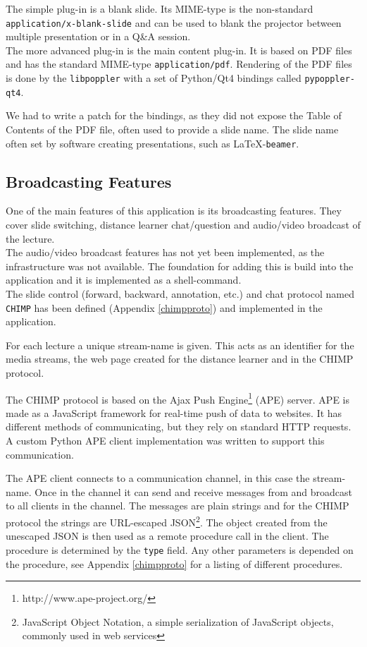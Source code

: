 \documentclass[a4paper,12pt]{article}
\begin{document}
The simple plug-in is a blank slide. Its MIME-type is the non-standard \texttt{application/x-blank-slide} and can be used to blank the projector between multiple presentation or in a Q\&A session.
\\

The more advanced plug-in is the main content plug-in. It is based on PDF files and has the standard MIME-type \texttt{application/pdf}. Rendering of the PDF files is done by the \texttt{libpoppler} with a set of Python/Qt4 bindings called \texttt{pypoppler-qt4}. 

We had to write a patch for the bindings, as they did not expose the Table of Contents of the PDF file, often used to provide a slide name. The slide name often set by software creating presentations, such as \LaTeX-\texttt{beamer}.

\subsection{Broadcasting Features}

One of the main features of this application is its broadcasting features. They cover slide switching, distance learner chat/question and audio/video broadcast of the lecture.
\\

The audio/video broadcast features has not yet been implemented, as the infrastructure was not available. The foundation for adding this is build into the application and it is implemented as a shell-command.
\\

The slide control (forward, backward, annotation, etc.) and chat protocol named \texttt{CHIMP} has been defined (Appendix \ref{chimpproto}) and implemented in the application.

For each lecture a unique stream-name is given. This acts as an identifier for the media streams, the web page created for the distance learner and in the CHIMP protocol.

The CHIMP protocol is based on the Ajax Push Engine\footnote{http://www.ape-project.org/} (APE) server. APE is made as a JavaScript framework for real-time push of data to websites. It has different methods of communicating, but they rely on standard HTTP requests. A custom Python APE client implementation was written to support this communication. 

The APE client connects to a communication channel, in this case the stream-name. Once in the channel it can send and receive messages from and broadcast to all clients in the channel.
The messages are plain strings and for the CHIMP protocol the strings are URL-escaped JSON\footnote{JavaScript Object Notation, a simple serialization of JavaScript objects, commonly used in web services}. The object created from the unescaped JSON is then used as a remote procedure call in the client. The procedure is determined by the \texttt{type} field. Any other parameters is depended on the procedure, see Appendix \ref{chimpproto} for a listing of different procedures.
\end{document}
